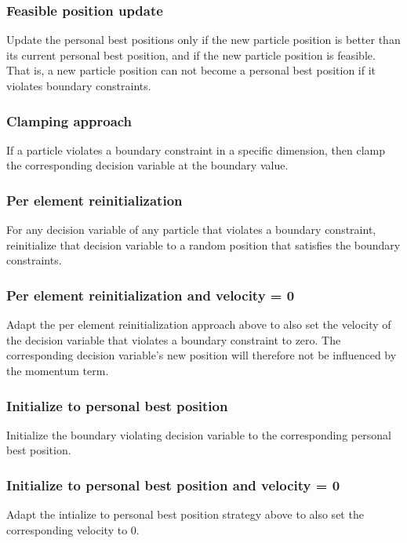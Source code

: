 \documentclass[conference]{IEEEtran}
\begin{document}
\subsubsection{\textbf{Feasible position update}}
Update the personal best positions only if the new particle position is better than its current personal best position, and if the new particle position is feasible. That is, a new particle position can not become
a personal best position if it violates boundary constraints.

\subsubsection{\textbf{Clamping approach}}
If a particle violates a boundary constraint in a specific dimension, then clamp the corresponding decision variable at the boundary value.

\subsubsection{\textbf{Per element reinitialization}}
For any decision variable of any particle that violates a boundary constraint, reinitialize that decision variable to a random position that satisfies the boundary constraints.

\subsubsection{\textbf{Per element reinitialization and velocity = 0}}
Adapt the per element reinitialization approach above to also set the velocity of the decision variable that violates a boundary constraint to zero. The corresponding decision variable’s new position will therefore not be influenced by the momentum term.

\subsubsection{\textbf{Initialize to personal best position}}
Initialize the boundary violating decision variable to the corresponding personal best position.

\subsubsection{\textbf{Initialize to personal best position and velocity = 0}}
Adapt the intialize to personal best position strategy above to also set the corresponding velocity to 0.
\end{document}
